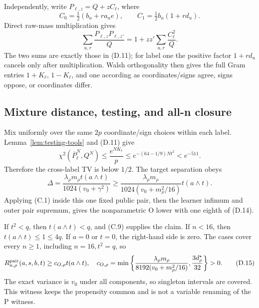 Independently, write \(P_{\ell,z}=Q+zC_\ell\), where
\[
 C_0=\tfrac12(b_u+ra_ue),\qquad
 C_1=\tfrac12b_u(1+rd_u).
\]
Direct raw-mass multiplication gives
\[
 \sum_{u,r}\frac{P_{\ell,z}P_{\ell,z'}}Q
 =1+zz'\sum_{u,r}\frac{C_\ell^2}Q.
 \tag{D.12}
\]
The two sums are exactly those in (D.11); for label one the positive factor
\(1+rd_u\) cancels only after multiplication.  Walsh orthogonality then
gives the full Gram entries \(1+K_\ell\), \(1-K_\ell\), and one according
as coordinates/signs agree, signs oppose, or coordinates differ.

\subsection{Mixture distance, testing, and all-n closure}

Mix uniformly over the same \(2p\) coordinate/sign choices within each
label.  Lemma~\ref{lem:testing-tools} and (D.11) give
\[
 \chi^2(\overline P_\ell^N,Q^N)
 \le\frac{e^{NK_\ell}}p
 \le e^{-(64-1/9)Nt^2}<e^{-511}.
 \tag{D.13}
\]
Therefore the cross-label TV is below \(1/2\).  The target separation obeys
\[
 \Delta
 =\frac{\lambda_\rho m_\rho t(a\wedge t)}
 {1024(v_0+\gamma^2)}
 \ge\frac{\lambda_\rho m_\rho}
 {1024(v_0+m_\rho^2/16)}
 t(a\wedge t).
 \tag{D.14}
\]
Applying (C.1) inside this one fixed public pair, then the learner infimum
and outer pair supremum, gives the nonparametric O lower with one eighth of
(D.14).

If \(t^2<q\), then \(t(a\wedge t)<q\), and (C.9) supplies the claim.  If
\(n<16\), then \(t(a\wedge t)\le1\le4q\).  If \(a=0\) or \(t=0\), the
right-hand side is zero.  The cases cover every \(n\ge1\), including
\(n=16,t^2=q\), so
\[
 R^{\mathrm{pair}}_{n,\rho}(a,s,b,t)\ge c_{O,\rho}t(a\wedge t),
 \quad
 c_{O,\rho}=
 \min\left\{\frac{\lambda_\rho m_\rho}
 {8192(v_0+m_\rho^2/16)},
             \frac{3d_\rho^\star}{32}\right\}>0.
 \tag{D.15}
\]
The exact variance is \(v_0\) under all components, so singleton intervals
are covered.  This witness keeps the propensity common and is not a variable
renaming of the P witness.
